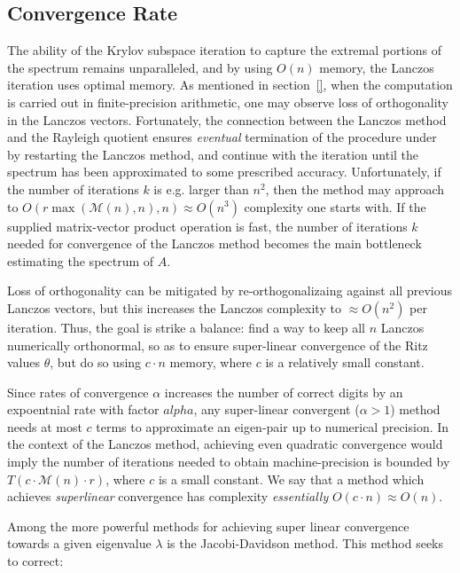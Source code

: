\documentclass[12pt]{article}
\numberwithin{equation}{section}
\newcommand{\+}{%
	\raisebox{0.18ex}{\scaleobj{0.55}{+}}
}
\theoremstyle{definition}
\begin{document}
\subsection*{Convergence Rate}
The ability of the Krylov subspace iteration to capture the extremal portions of the spectrum remains unparalleled, and by using $O(n)$ memory, the Lanczos iteration uses optimal memory. 
As mentioned in section~\ref{}, when the computation is carried out in finite-precision arithmetic, one may observe loss of orthogonality in the Lanczos vectors. 
Fortunately, the connection between the Lanczos method and the Rayleigh quotient ensures \emph{eventual} termination of the procedure under by restarting the Lanczos method, and continue with the iteration until the spectrum has been approximated to some prescribed accuracy. 
Unfortunately, if the number of iterations $k$ is e.g. larger than $n^2$, then the method may approach to $O(r\max(\mathcal{M}(n), n), n) \approx O(n^3)$ complexity one starts with. 
If the supplied matrix-vector product operation is fast, the number of iterations $k$ needed for convergence of the Lanczos method becomes the main bottleneck estimating the spectrum of $A$.

Loss of orthogonality can be mitigated by re-orthogonalizaing against all previous Lanczos vectors, but this increases the Lanczos complexity to $\approx O(n^2)$ per iteration. 
Thus, the goal is strike a balance: find a way to keep all $n$ Lanczos numerically orthonormal, so as to ensure super-linear convergence of the Ritz values $\theta$, but do so using $c \cdot n$ memory, where $c$ is a relatively small constant.

Since rates of convergence $\alpha$ increases the number of correct digits by an expoentnial rate with factor $alpha$, any super-linear convergent ($\alpha > 1$) method needs at most $c$ terms to approximate an eigen-pair up to numerical precision. 
In the context of the Lanczos method, achieving even quadratic convergence would imply the number of iterations needed to obtain machine-precision is bounded by $T(c \cdot \mathcal{M}(n) \cdot r)$, where $c$ is a small constant. We say that a method which achieves \emph{superlinear} convergence has complexity \emph{essentially} $O(c\cdot n) \approx O(n)$.


Among the more powerful methods for achieving super linear convergence towards a given eigenvalue $\lambda$ is the Jacobi-Davidson method. This method seeks to correct:
\end{document}
